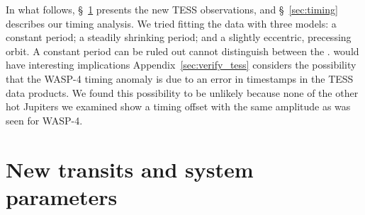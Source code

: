 \documentclass[12pt,twocolumn,tighten]{aastex62}
\begin{document}
{In what follows, \S~\ref{sec:observations} presents the new TESS
observations, and \S~\ref{sec:timing} describes our timing analysis.
We tried fitting the data with three models: a constant period; a
steadily shrinking period; and a slightly eccentric, precessing orbit.  A
constant period can be ruled out cannot
distinguish between the .   would have interesting implications
Appendix~\ref{sec:verify_tess} considers the possibility that the
WASP-4 timing anomaly is due to an error in timestamps in the TESS
data products.  We found this possibility to be unlikely because none
of the other hot Jupiters we examined show a timing offset with the
same amplitude as was seen for WASP-4.


\section{New transits and system parameters}
\label{sec:observations}

}
\end{document}
